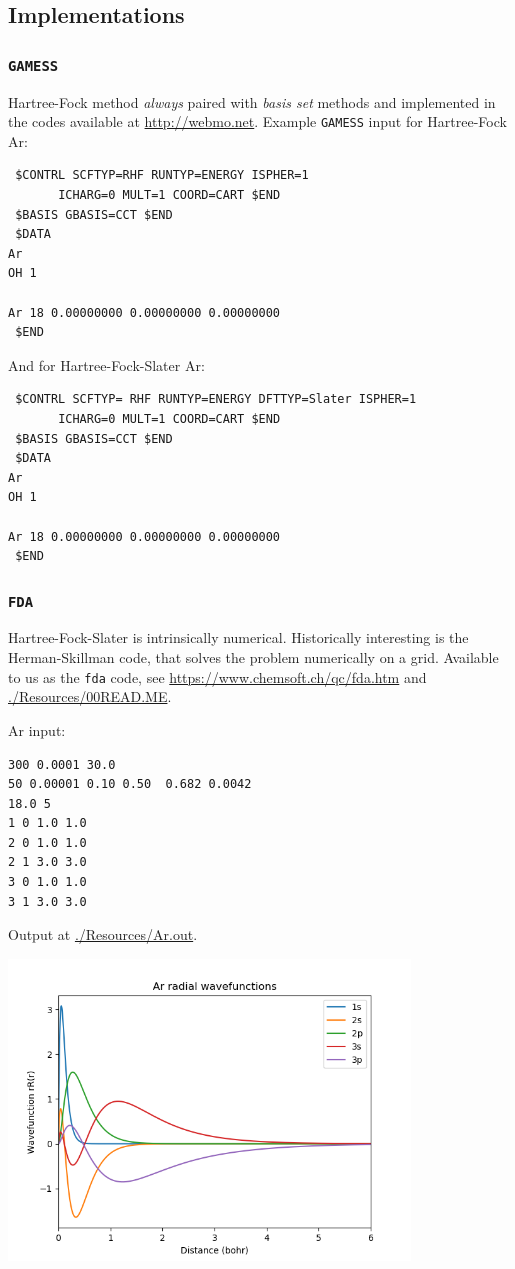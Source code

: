 \documentclass[11pt]{article}
\begin{document}
\subsection{Implementations}
\label{sec:org0792c4d}
\subsubsection{\texttt{GAMESS}}
\label{sec:org5b8b2b4}
Hartree-Fock method \emph{always} paired with \emph{basis set} methods and implemented in the codes available at \url{http://webmo.net}.  Example \texttt{GAMESS} input for Hartree-Fock Ar:

\begin{verbatim}
 $CONTRL SCFTYP=RHF RUNTYP=ENERGY ISPHER=1
       ICHARG=0 MULT=1 COORD=CART $END
 $BASIS GBASIS=CCT $END
 $DATA
Ar
OH 1

Ar 18 0.00000000 0.00000000 0.00000000
 $END
\end{verbatim}

And for Hartree-Fock-Slater Ar:

\begin{verbatim}
 $CONTRL SCFTYP= RHF RUNTYP=ENERGY DFTTYP=Slater ISPHER=1
       ICHARG=0 MULT=1 COORD=CART $END
 $BASIS GBASIS=CCT $END
 $DATA
Ar
OH 1

Ar 18 0.00000000 0.00000000 0.00000000
 $END
\end{verbatim}

\subsubsection{\texttt{FDA}}
\label{sec:org317a334}
Hartree-Fock-Slater is intrinsically numerical.  Historically interesting is the Herman-Skillman code, that solves the problem numerically on a grid.  Available to us as the \texttt{fda} code, see \url{https://www.chemsoft.ch/qc/fda.htm} and \url{./Resources/00READ.ME}.

Ar input:
\begin{verbatim}
300 0.0001 30.0
50 0.00001 0.10 0.50  0.682 0.0042
18.0 5
1 0 1.0 1.0
2 0 1.0 1.0
2 1 3.0 3.0
3 0 1.0 1.0
3 1 3.0 3.0
\end{verbatim}

Output at \url{./Resources/Ar.out}.

\begin{center}
\includegraphics[width=0.8\textwidth]{./Images/Ar-wave-functions.png}
\end{center}
\end{document}
